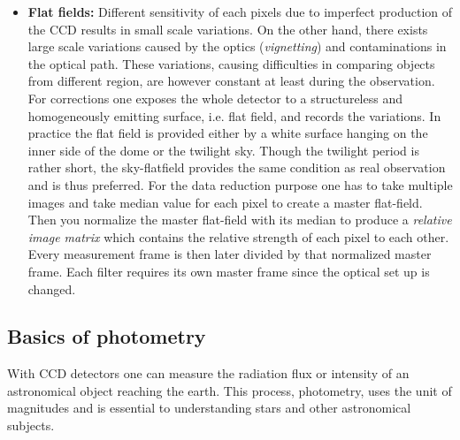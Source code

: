 \begin{itemize}
\item\textbf{Flat fields:}
Different sensitivity of each pixels due to imperfect production of the CCD results in small scale variations. On the other hand, there exists large scale variations caused by the optics (\textit{vignetting}) and contaminations in the optical path. These variations, causing difficulties in comparing objects from different region, are however constant at least during the observation. For corrections one exposes the whole detector to a structureless and homogeneously emitting surface, i.e. flat field, and records the variations. In practice the flat field is provided either by a white surface hanging on the inner side of the dome or the twilight sky. Though the twilight period is rather short, the sky-flatfield provides the same condition as real observation and is thus preferred. For the data reduction purpose one has to take multiple images and take median value for each pixel to create a master flat-field. Then you normalize the master flat-field with its median to produce a \textit{relative image matrix} which contains the relative strength of each pixel to each other. Every measurement frame is then later divided by that normalized master frame. Each filter requires its own master frame since the optical set up is changed.

\end{itemize}

\subsection{Basics of photometry} \label{photometry}
With CCD detectors one can measure the radiation flux or intensity of an astronomical object reaching the earth. This process, photometry, uses the unit of magnitudes and is essential to understanding stars and other astronomical subjects. 

